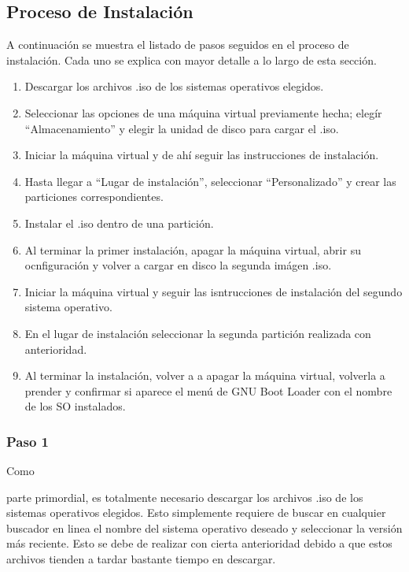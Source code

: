 \documentclass[stu, 12pt, letterpaper, donotrepeattitle, floatsintext, natbib]{apa7}
\begin{document}
    \subsection*{Proceso de Instalación}
    A continuación se muestra el listado de pasos seguidos en el proceso de instalación. Cada uno se explica con mayor detalle a lo largo de esta sección.\par
    \begin{enumerate}
      \item Descargar los archivos .iso de los sistemas operativos elegidos.
      \item Seleccionar las opciones de una máquina virtual previamente hecha; elegír ``Almacenamiento'' y elegir la unidad de disco para cargar el .iso.
      \item Iniciar la máquina virtual y de ahí seguir las instrucciones de instalación.
      \item Hasta llegar a ``Lugar de instalación'', seleccionar ``Personalizado'' y crear las particiones correspondientes.
      \item Instalar el .iso dentro de una partición.
      \item Al terminar la primer instalación, apagar la máquina virtual, abrir su ocnfiguración y volver a cargar en disco la segunda imágen .iso.
      \item Iniciar la máquina virtual y seguir las isntrucciones de instalación del segundo sistema operativo.
      \item En el lugar de instalación seleccionar la segunda partición realizada con anterioridad.
      \item Al terminar la instalación, volver a a apagar la máquina virtual, volverla a prender y confirmar si aparece el menú de GNU Boot Loader con el nombre de los SO instalados.
    \end{enumerate}
    \vspace{\baselineskip}
    \subsubsection*{Paso 1}
    Como \begin{justifying}
      parte primordial, es totalmente necesario descargar los archivos .iso de los sistemas operativos elegidos. Esto simplemente requiere de buscar
    en cualquier buscador en linea el nombre del sistema operativo deseado y seleccionar la versión más reciente. Esto se debe de realizar con cierta anterioridad
    debido a que estos archivos tienden a tardar bastante tiempo en descargar.\par
    \end{justifying}
\end{document}
